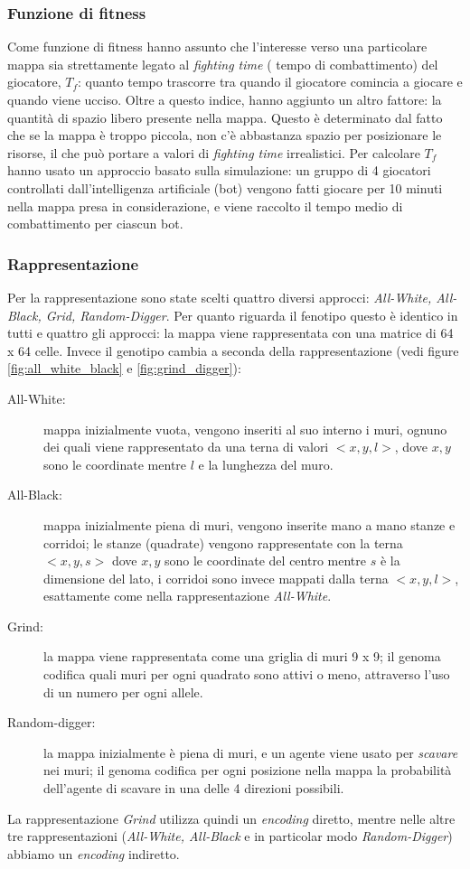 \documentclass[12pt, italian]{toptesi}
\begin{document}
\subsubsection{Funzione di fitness}
Come funzione di fitness hanno assunto che l'interesse verso una particolare mappa sia strettamente legato al \emph{fighting time} ( tempo di combattimento) del giocatore, $T_f$:
quanto tempo trascorre tra quando il giocatore comincia a giocare e quando viene ucciso.
Oltre a questo indice, hanno aggiunto un altro fattore: la quantità di spazio libero presente nella mappa. Questo è determinato dal fatto che se la mappa è troppo piccola, 
non c'è abbastanza spazio per posizionare le risorse, il che può portare a valori di \emph{fighting time} irrealistici.
Per calcolare $T_f$ hanno usato un approccio basato sulla simulazione: un gruppo di 4 giocatori controllati dall'intelligenza artificiale (bot) vengono fatti giocare per 10 minuti nella mappa presa in considerazione, e viene raccolto il tempo medio di combattimento per ciascun bot.
 
 
\subsubsection{Rappresentazione}
Per la rappresentazione sono state scelti quattro diversi approcci: \emph{All-White, All-Black, Grid, Random-Digger}.
Per quanto riguarda il fenotipo questo è identico in tutti e quattro gli approcci: la mappa viene rappresentata con una matrice di 64 x 64 celle.
Invece il genotipo cambia a seconda della rappresentazione (vedi figure \ref{fig:all_white_black} e \ref{fig:grind_digger}):
\begin{description}
\item[All-White:] mappa inizialmente vuota, vengono inseriti al suo interno i muri, ognuno dei quali viene rappresentato da una terna di valori $<x, y, l>$, dove
$x,y$ sono le coordinate mentre $l$ e la lunghezza del muro.
\item[All-Black:] mappa inizialmente piena di muri,  vengono inserite mano a mano stanze e corridoi; le stanze (quadrate) vengono rappresentate con la terna $<x, y, s>$ dove $x, y$ sono le coordinate del centro mentre $s$ è la dimensione del lato, i corridoi sono invece mappati dalla terna $<x, y, l>$, esattamente come nella rappresentazione \emph{All-White}.
\item[Grind:] la mappa viene rappresentata come una griglia di muri 9 x 9;  il genoma codifica quali muri per ogni quadrato sono attivi o meno, attraverso l'uso di un numero per ogni allele.
\item[Random-digger:] la mappa inizialmente è piena di muri, e un agente viene usato per  \emph{scavare} nei muri; il genoma codifica per ogni posizione nella mappa la probabilità dell'agente di scavare in una delle 4 direzioni possibili.
\end{description}
La rappresentazione \emph{Grind} utilizza quindi un \emph{encoding} diretto, mentre nelle altre tre rappresentazioni (\emph{All-White, All-Black} e in particolar modo \emph{Random-Digger}) abbiamo un \emph{encoding} indiretto.
\end{document}
